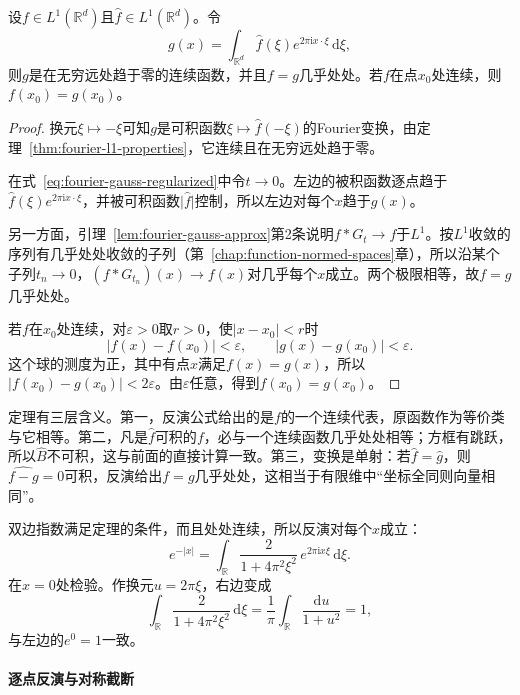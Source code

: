 \begin{theorem}[$L^1$反演定理]
\label{thm:fourier-l1-inversion}
设$f\in L^1(\mathbb R^d)$且$\widehat f\in L^1(\mathbb R^d)$。令
\begin{equation}
g(x)=\int_{\mathbb R^d}\widehat f(\xi)e^{2\pi\mathrm ix\cdot\xi}\,\mathrm d\xi ,
\label{eq:fourier-l1-inversion}
\end{equation}
则$g$是在无穷远处趋于零的连续函数，并且$f=g$几乎处处。若$f$在点$x_0$处连续，则$f(x_0)=g(x_0)$。
\end{theorem}

\begin{proof}
换元$\xi\mapsto-\xi$可知$g$是可积函数$\xi\mapsto\widehat f(-\xi)$的Fourier变换，由定理~\ref{thm:fourier-l1-properties}，它连续且在无穷远处趋于零。

在式~\eqref{eq:fourier-gauss-regularized}中令$t\to0$。左边的被积函数逐点趋于$\widehat f(\xi)e^{2\pi\mathrm ix\cdot\xi}$，并被可积函数$\lvert\widehat f\rvert$控制，所以左边对每个$x$趋于$g(x)$。

另一方面，引理~\ref{lem:fourier-gauss-approx}第2条说明$f*G_t\to f$于$L^1$。按$L^1$收敛的序列有几乎处处收敛的子列（第~\ref{chap:function-normed-spaces}章），所以沿某个子列$t_n\to0$，$(f*G_{t_n})(x)\to f(x)$对几乎每个$x$成立。两个极限相等，故$f=g$几乎处处。

若$f$在$x_0$处连续，对$\varepsilon>0$取$r>0$，使$\lvert x-x_0\rvert<r$时
\[
\lvert f(x)-f(x_0)\rvert<\varepsilon,\qquad\lvert g(x)-g(x_0)\rvert<\varepsilon.
\]
这个球的测度为正，其中有点$x$满足$f(x)=g(x)$，所以$\lvert f(x_0)-g(x_0)\rvert<2\varepsilon$。由$\varepsilon$任意，得到$f(x_0)=g(x_0)$。
\end{proof}

定理有三层含义。第一，反演公式给出的是$f$的一个连续代表，原函数作为等价类与它相等。第二，凡是$\widehat f$可积的$f$，必与一个连续函数几乎处处相等；方框有跳跃，所以$\widehat B$不可积，这与前面的直接计算一致。第三，变换是单射：若$\widehat f=\widehat g$，则$\widehat{f-g}=0$可积，反演给出$f=g$几乎处处，这相当于有限维中“坐标全同则向量相同”。

双边指数满足定理的条件，而且处处连续，所以反演对每个$x$成立：
\[
e^{-\lvert x\rvert}=\int_{\mathbb R}\frac{2}{1+4\pi^2\xi^2}\,e^{2\pi\mathrm ix\xi}\,\mathrm d\xi.
\]
在$x=0$处检验。作换元$u=2\pi\xi$，右边变成
\[
\int_{\mathbb R}\frac{2}{1+4\pi^2\xi^2}\,\mathrm d\xi=\frac1\pi\int_{\mathbb R}\frac{\mathrm du}{1+u^2}=1,
\]
与左边的$e^0=1$一致。

\paragraph{逐点反演与对称截断}

